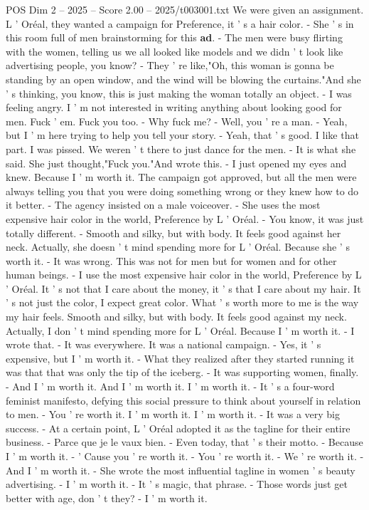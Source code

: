 \begin{textsample}{POS Dim 2 – 2025 – Score 2.00 – 2025/t003001.txt}
We were given an assignment.
L ' Oréal, they wanted a campaign for Preference, it ' s a hair color. - She ' s in this room full of men brainstorming for this \textbf{ad}. - The men were busy flirting with the women, telling us we all looked like models and we didn ' t look like advertising people, you know? - They ' re like,"Oh, this woman is gonna be standing by an open window, and the wind will be blowing the curtains."And she ' s thinking, you know, this is just making the woman totally an object. - I was feeling angry.
I ' m not interested in writing anything about looking good for men.
Fuck ' em.
Fuck you too. - Why fuck me? - Well, you ' re a man. - Yeah, but I ' m here trying to help you tell your story. - Yeah, that ' s good.
I like that part.
I was pissed.
We weren ' t there to just dance for the men. - It is what she said.
She just thought,"Fuck you."And wrote this. - I just opened my eyes and knew.
Because I ' m worth it.
The campaign got approved, but all the men were always telling you that you were doing something wrong or they knew how to do it better. - The agency insisted on a male voiceover. - She uses the most expensive hair color in the world, Preference by L ' Oréal. - You know, it was just totally different. - Smooth and silky, but with body.
It feels good against her neck.
Actually, she doesn ' t mind spending more for L ' Oréal.
Because she ' s worth it. - It was wrong.
This was not for men but for women and for other human beings. - I use the most expensive hair color in the world, Preference by L ' Oréal.
It ' s not that I care about the money, it ' s that I care about my hair.
It ' s not just the color, I expect great color.
What ' s worth more to me is the way my hair feels.
Smooth and silky, but with body.
It feels good against my neck.
Actually, I don ' t mind spending more for L ' Oréal.
Because I ' m worth it. - I wrote that. - It was everywhere.
It was a national campaign. - Yes, it ' s expensive, but I ' m worth it. - What they realized after they started running it was that that was only the tip of the iceberg. - It was supporting women, finally. - And I ' m worth it.
And I ' m worth it.
I ' m worth it. - It ' s a four-word feminist manifesto, defying this social pressure to think about yourself in relation to men. - You ' re worth it.
I ' m worth it.
I ' m worth it. - It was a very big success. - At a certain point, L ' Oréal adopted it as the tagline for their entire business. - Parce que je le vaux bien. - Even today, that ' s their motto. - Because I ' m worth it. - ' Cause you ' re worth it. - You ' re worth it. - We ' re worth it. - And I ' m worth it. - She wrote the most influential tagline in women ' s beauty advertising. - I ' m worth it. - It ' s magic, that phrase. - Those words just get better with age, don ' t they? - I ' m worth it.

\end{textsample}
